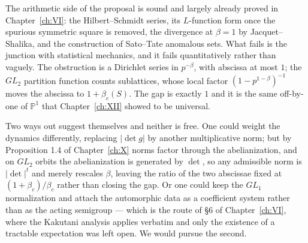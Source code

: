 The arithmetic side of the proposal is sound and largely already proved in
Chapter~\ref{ch:VI}: the Hilbert--Schmidt series, its $L$-function form once the spurious
symmetric square is removed, the divergence at $\beta=1$ by Jacquet--Shalika, and the
construction of Sato--Tate anomalous sets. What fails is the junction with statistical
mechanics, and it fails quantitatively rather than vaguely. The obstruction is a Dirichlet
series in $p^{-\beta}$, with abscissa at most $1$; the $GL_2$ partition function counts
sublattices, whose local factor $(1-p^{1-\beta})^{-1}$ moves the abscissa to
$1+\beta_c(S)$. The gap is exactly $1$ and it is the same off-by-one of $\mathbb P^1$ that
Chapter~\ref{ch:XII} showed to be universal.

Two ways out suggest themselves and neither is free. One could weight the dynamics
differently, replacing $|\det g|$ by another multiplicative norm; but by
Proposition 1.4 of Chapter~\ref{ch:X} norms factor through the abelianization, and on $GL_2$ orbits the
abelianization is generated by $\det$, so any admissible norm is $|\det|^t$ and merely
rescales $\beta$, leaving the ratio of the two abscissae fixed at
$(1+\beta_c)/\beta_c$ rather than closing the gap. Or one could keep the $GL_1$
normalization and attach the automorphic data as a coefficient system rather than as the
acting semigroup --- which is the route of \S6 of Chapter~\ref{ch:VI}, where the Kakutani analysis
applies verbatim and only the existence of a tractable expectation was left open. We would
pursue the second.

